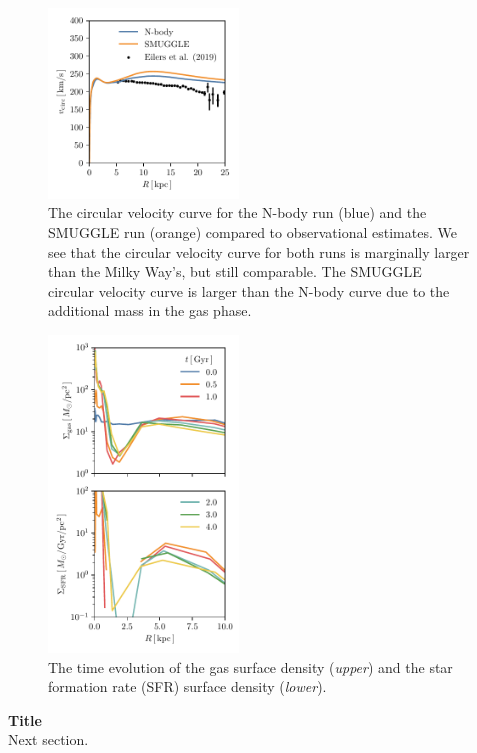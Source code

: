 \documentclass{natureprintstyle}
\begin{document}
\begin{figure}[h]%
\centering
\includegraphics[width=0.45\textwidth]{fig/fig-vcirc.pdf}
\caption{The circular velocity curve for the N-body run (blue) and the SMUGGLE
run (orange) compared to observational estimates.\cite{2019ApJ...871..120E} We
see that the circular velocity curve for both runs is marginally larger than
the Milky Way's, but still comparable. The SMUGGLE circular velocity curve is
larger than the N-body curve due to the additional mass in the gas phase.}
\label{fig:surf}
\end{figure}

\begin{figure}[h]%
\centering
\includegraphics[width=0.45\textwidth]{fig/fig-surf.pdf}
\caption{The time evolution of the gas surface density (\textit{upper}) and the star formation rate (SFR) surface density (\textit{lower}).  } \label{fig:surf}
\end{figure}



\vspace{12pt}

\noindent
{\bf Title}
\\
\noindent
Next section.

% 
\end{document}
